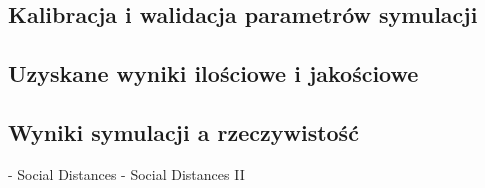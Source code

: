 \documentclass[a4paper, 12pt]{article}
\begin{document}
        \subsection{Kalibracja i walidacja parametrów symulacji}
        \label{sec:p}


        \subsection{Uzyskane wyniki ilościowe i jakościowe}
        \label{sec:results}


        \subsection{Wyniki symulacji a rzeczywistość}
        \label{sec:sim-vs-reality}


\newpage
    \label{sec:refs}


    \begin{thebibliography}{9}
         - Social Distances
         - Social Distances II
    \end{thebibliography}
\end{document}
